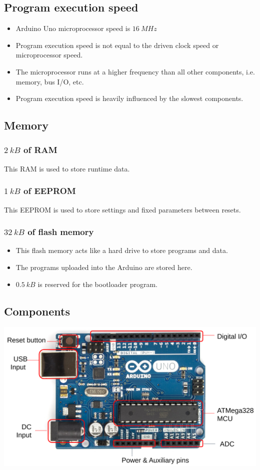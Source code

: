 \documentclass[11pt]{article}
\begin{document}
 \newpage
\subsection{Program execution speed}
\label{sec:org5e19e74}
\begin{itemize}
\item Arduino Uno microprocessor speed is \(\qty{16}{MHz}\)
\item Program execution speed is not equal to the driven clock speed or microprocessor speed.
\item The microprocessor runs at a higher frequency than all other components, i.e. memory, bus I/O, etc.
\item Program execution speed is heavily influenced by the slowest components.
\end{itemize}
\subsection{Memory}
\label{sec:orgcdaf1a8}

\subsubsection{\(\qty{2}{kB}\) of RAM}
\label{sec:orga31131a}
This RAM is used to store runtime data.
\subsubsection{\(\qty{1}{kB}\) of EEPROM}
\label{sec:orgdc1e3dc}
This EEPROM is used to store settings and fixed parameters between resets.
\subsubsection{\(\qty{32}{kB}\) of flash memory}
\label{sec:org3f12141}
\begin{itemize}
\item This flash memory acts like a hard drive to store programs and data.
\item The programs uploaded into the Arduino are stored here.
\item \(\qty{0.5}{kB}\) is reserved for the bootloader program.
\end{itemize}
\subsection{Components}
\label{sec:orgbeb9d1e}
\begin{center}
\includegraphics[width=.9\linewidth]{./images/arduino-uno-components.png}
\end{center}
\end{document}

